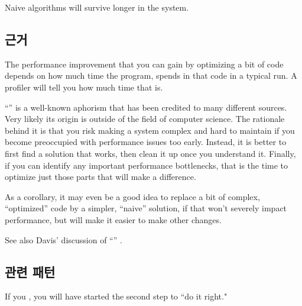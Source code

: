 \documentclass[a4paper,10pt,twoside]{book}
\begin{document}
\begin{bulletlist}
\item Naive algorithms will survive longer in the system.
\end{bulletlist}

\subsection*{근거}

The performance improvement that you can gain by optimizing a bit of code depends on how much time the program, spends in that code in a typical run. A profiler will tell you how much time that is.

``'' is a well-known aphorism that has been credited to many different sources. Very likely its origin is outside of the field of computer science. The rationale behind it is that you risk making a system complex and hard to maintain if you become preoccupied with performance issues too early. Instead, it is better to first find a solution that works, then clean it up once you understand it. Finally, if you can identify any important performance bottlenecks, that is the time to optimize just those parts that will make a difference.

As a corollary, it may even be a good idea to replace a bit of complex, ``optimized'' code by a simpler, ``naive'' solution, if that won't severely impact performance, but will make it easier to make other changes. 

See also Davis' discussion of ``'' \cite{Davi95a}.

\subsection*{관련 패턴}

If you , you will have started the second step to ``do it right."

\ifx\wholebook\relax\else
   
   
   
\end{document}
